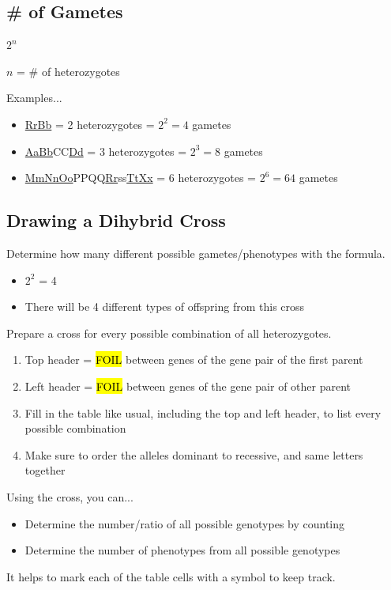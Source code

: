 \documentclass[a4paper,12pt]{article}
\begin{document}
\subsection{\# of Gametes}\noindent

\begin{center}
\Huge $2^n$ \normalsize

$n$ = \# of heterozygotes
\end{center}

Examples...
\begin{itemize}
    \item{\underline{RrBb} = 2 heterozygotes = $2^2 = 4$ gametes}
    \item{\underline{AaBb}CC\underline{Dd} = 3 heterozygotes = $2^3 = 8$ gametes}
    \item{\underline{MmNnOo}PPQQ\underline{Rr}ss\underline{TtXx} = 6 heterozygotes = $2^6 = 64$ gametes}
\end{itemize}

\pagebreak

\subsection{Drawing a Dihybrid Cross}
Determine how many different possible gametes/phenotypes with the formula.
\begin{itemize}
    \item{$2^2$ = 4}
    \item{There will be 4 different types of offspring from this cross}
        \\
\end{itemize}

Prepare a cross for every possible combination of all heterozygotes.
\begin{enumerate}
    \item{Top header = \hl{FOIL} between genes of the gene pair of the first parent}
    \item{Left header = \hl{FOIL} between genes of the gene pair of other parent}
    \item{Fill in the table like usual, including the top and left header, to list every possible combination}
    \item{Make sure to order the alleles dominant to recessive, and same letters together}
\end{enumerate}

Using the cross, you can...
\begin{itemize}
    \item{Determine the number/ratio of all possible genotypes by counting}
    \item{Determine the number of phenotypes from all possible genotypes}
\end{itemize}
It helps to mark each of the table cells with a symbol to keep track.
\end{document}
